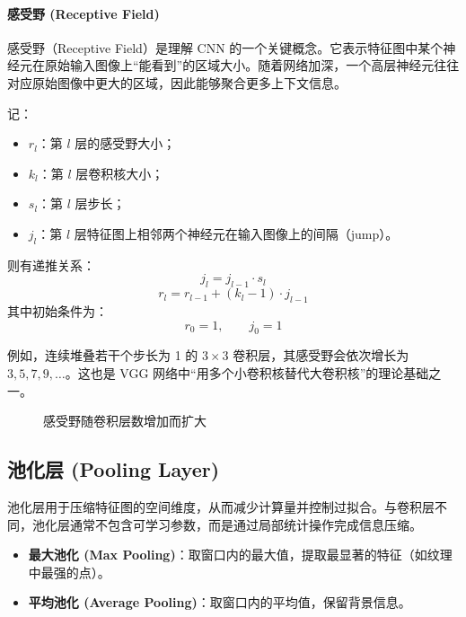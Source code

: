 \paragraph{感受野 (Receptive Field)}

感受野（Receptive Field）是理解 CNN 的一个关键概念。它表示特征图中某个神经元在原始输入图像上“能看到”的区域大小。随着网络加深，一个高层神经元往往对应原始图像中更大的区域，因此能够聚合更多上下文信息。

记：
\begin{itemize}
    \item $r_l$：第 $l$ 层的感受野大小；
    \item $k_l$：第 $l$ 层卷积核大小；
    \item $s_l$：第 $l$ 层步长；
    \item $j_l$：第 $l$ 层特征图上相邻两个神经元在输入图像上的间隔（jump）。
\end{itemize}

则有递推关系：
\begin{equation}
j_l = j_{l-1}\cdot s_l
\end{equation}
\begin{equation}
r_l = r_{l-1} + (k_l - 1)\cdot j_{l-1}
\end{equation}
其中初始条件为：
\[
r_0 = 1,\qquad j_0 = 1
\]

例如，连续堆叠若干个步长为 1 的 $3\times3$ 卷积层，其感受野会依次增长为 $3,5,7,9,\dots$。这也是 VGG 网络中“用多个小卷积核替代大卷积核”的理论基础之一。

\begin{figure}[H]
  \centering
  \resizebox{\textwidth}{!}{}
  \caption{感受野随卷积层数增加而扩大}
  \label{fig:ch09_orig8}
\end{figure}

\subsection{池化层 (Pooling Layer)}

池化层用于压缩特征图的空间维度，从而减少计算量并控制过拟合。与卷积层不同，池化层通常不包含可学习参数，而是通过局部统计操作完成信息压缩。

\begin{itemize}
    \item \textbf{最大池化 (Max Pooling)}：取窗口内的最大值，提取最显著的特征（如纹理中最强的点）。
    \item \textbf{平均池化 (Average Pooling)}：取窗口内的平均值，保留背景信息。
\end{itemize}

